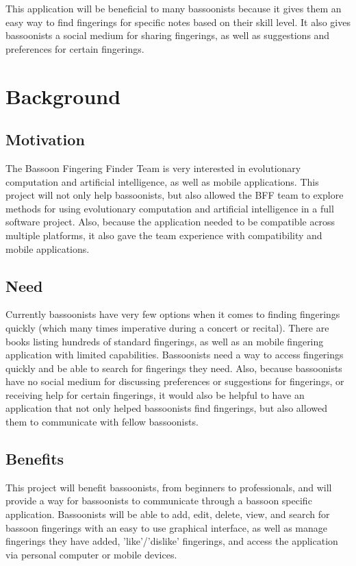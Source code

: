 \documentclass[12pt,english]{article}
\begin{document}
This application will be beneficial to many bassoonists because it
gives them an easy way to find fingerings for specific notes based
on their skill level. It also gives bassoonists a social medium for
sharing fingerings, as well as suggestions and preferences for certain
fingerings.


\section{Background}


\subsection{Motivation}

The Bassoon Fingering Finder Team is very interested in evolutionary
computation and artificial intelligence, as well as mobile applications.
This project will not only help bassoonists, but also allowed the
BFF team to explore methods for using evolutionary computation and
artificial intelligence in a full software project. Also, because
the application needed to be compatible across multiple platforms,
it also gave the team experience with compatibility and mobile applications.


\subsection{Need}

Currently bassoonists have very few options when it comes to finding
fingerings quickly (which many times imperative during a concert or
recital). There are books listing hundreds of standard fingerings,
as well as an mobile fingering application with limited capabilities.
Bassoonists need a way to access fingerings quickly and be able to
search for fingerings they need. Also, because bassoonists have no
social medium for discussing preferences or suggestions for fingerings,
or receiving help for certain fingerings, it would also be helpful
to have an application that not only helped bassoonists find fingerings,
but also allowed them to communicate with fellow bassoonists.


\subsection{Benefits}

This project will benefit bassoonists, from beginners to professionals,
and will provide a way for bassoonists to communicate through a bassoon
specific application. Bassoonists will be able to add, edit, delete,
view, and search for bassoon fingerings with an easy to use graphical
interface, as well as manage fingerings they have added, 'like'/'dislike'
fingerings, and access the application via personal computer or mobile
devices.
\end{document}
